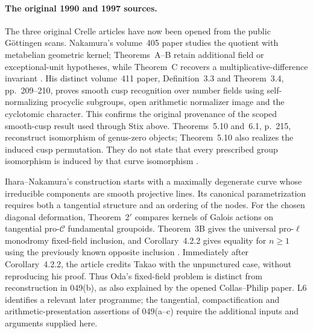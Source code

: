 \paragraph{The original 1990 and 1997 sources.}
The three original Crelle articles have now been opened from the
public G\"ottingen scans. Nakamura's volume~405 paper studies the
quotient with metabelian geometric kernel; Theorems~A--B retain
additional field or exceptional-unit hypotheses, while Theorem~C
recovers a multiplicative-difference invariant
\cite{A567_Nakamura1990Metabelian}.
His distinct volume~411 paper, Definition~3.3 and Theorem~3.4,
pp.~209--210, proves smooth cusp recognition over number fields using
self-normalizing procyclic subgroups, open arithmetic normalizer
image and the cyclotomic character. This confirms the original
provenance of the scoped smooth-cusp result used through Stix above.
Theorems~5.10 and~6.1, p.~215, reconstruct isomorphism of genus-zero
objects; Theorem~5.10 also realizes the induced cusp permutation.
They do not state that every prescribed group isomorphism is
induced by that curve isomorphism \cite{A567_Nakamura1990}.

Ihara--Nakamura's construction starts with a maximally degenerate
curve whose irreducible components are smooth projective lines.
Its canonical parametrization requires both a tangential structure
and an ordering of the nodes. For the chosen diagonal deformation,
Theorem~2$'$ compares kernels of Galois actions on tangential
pro-$\mathcal C$ fundamental groupoids.
Theorem~3B gives the universal pro-$\ell$ monodromy fixed-field
inclusion, and Corollary~4.2.2 gives equality for $n\geq1$ using
the previously known opposite inclusion
\cite[\S\S1.2--1.4, 3.6, 4.1--4.2, pp.~125--127,146--148]{A567_IharaNakamura1997}.
Immediately after Corollary~4.2.2, the article credits Takao with
the unpunctured case, without reproducing his proof.
Thus Oda's fixed-field problem is distinct from reconstruction in
049(b), as also explained by the opened Collas--Philip paper.
L6 identifies a relevant later programme; the tangential,
compactification and arithmetic-presentation assertions of
049(a--c) require the additional inputs and arguments supplied here.
